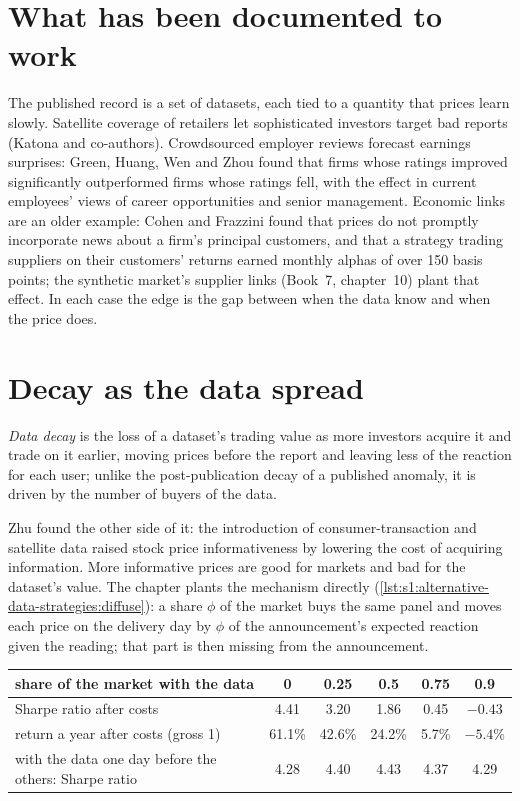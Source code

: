 \section{What has been documented to work}

The published record is a set of datasets, each tied to a quantity that prices learn slowly. Satellite coverage of retailers let sophisticated investors
target bad reports (Katona and co-authors). Crowdsourced employer reviews forecast earnings surprises: Green, Huang, Wen and Zhou found that firms whose
ratings improved significantly outperformed firms whose ratings fell, with the effect in current employees' views of career opportunities and senior
management. Economic links are an older example: Cohen and Frazzini found that prices do not promptly incorporate news about a firm's principal customers,
and that a strategy trading suppliers on their customers' returns earned monthly alphas of over 150 basis points; the synthetic market's supplier links
(Book~7, chapter~10) plant that effect. In each case the edge is the gap between when the data know and when the price does.

\section{Decay as the data spread}

\begin{definition}\label{def:s1:alternative-data-strategies:decay}
\emph{Data decay} is the loss of a dataset's trading value as more investors acquire it and trade on it earlier, moving prices before the
report and leaving less of the reaction for each user; unlike the post-publication decay of a published anomaly, it is driven by the number of buyers of the
data.
\end{definition}

Zhu found the other side of it: the introduction of consumer-transaction and satellite data raised stock price informativeness by lowering the cost of
acquiring information. More informative prices are good for markets and bad for the dataset's value. The chapter plants the mechanism directly
(\cref{lst:s1:alternative-data-strategies:diffuse}): a share $\phi$ of the market buys the same panel and moves each price on the delivery day by $\phi$ of
the announcement's expected reaction given the reading; that part is then missing from the announcement.

\begin{center}
\small
\begin{tabular}{@{}lccccc@{}}
\toprule
share of the market with the data & 0 & 0.25 & 0.5 & 0.75 & 0.9\\
\midrule
Sharpe ratio after costs & 4.41 & 3.20 & 1.86 & 0.45 & $-0.43$\\
return a year after costs (gross 1) & 61.1\% & 42.6\% & 24.2\% & 5.7\% & $-5.4\%$\\
\midrule
with the data one day before the others: Sharpe ratio & 4.28 & 4.40 & 4.43 & 4.37 & 4.29\\
\bottomrule
\end{tabular}
\end{center}

